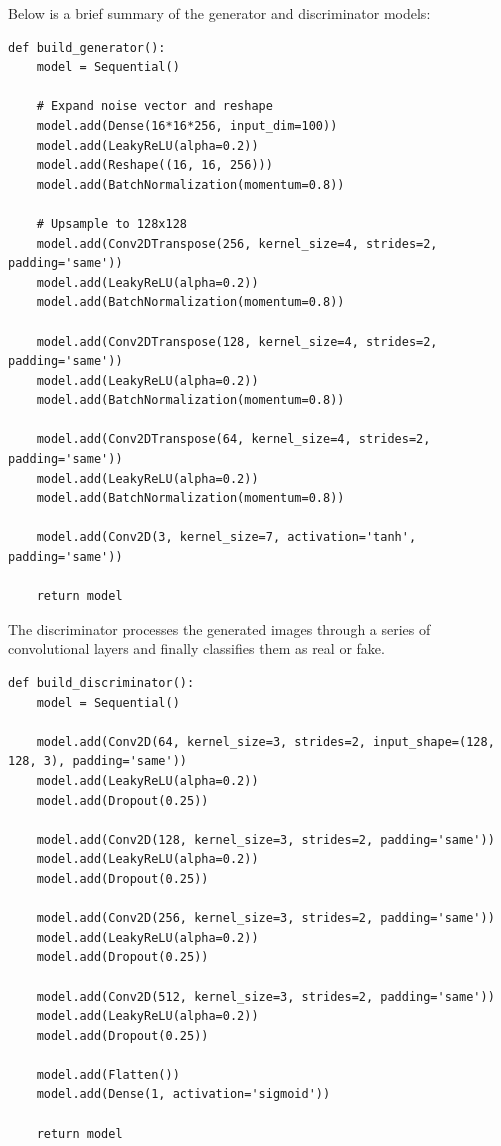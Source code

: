 Below is a brief summary of the generator and discriminator models:

\begin{verbatim}
def build_generator():
    model = Sequential()

    # Expand noise vector and reshape
    model.add(Dense(16*16*256, input_dim=100))
    model.add(LeakyReLU(alpha=0.2))
    model.add(Reshape((16, 16, 256)))
    model.add(BatchNormalization(momentum=0.8))

    # Upsample to 128x128
    model.add(Conv2DTranspose(256, kernel_size=4, strides=2, padding='same'))
    model.add(LeakyReLU(alpha=0.2))
    model.add(BatchNormalization(momentum=0.8))

    model.add(Conv2DTranspose(128, kernel_size=4, strides=2, padding='same'))
    model.add(LeakyReLU(alpha=0.2))
    model.add(BatchNormalization(momentum=0.8))

    model.add(Conv2DTranspose(64, kernel_size=4, strides=2, padding='same'))
    model.add(LeakyReLU(alpha=0.2))
    model.add(BatchNormalization(momentum=0.8))

    model.add(Conv2D(3, kernel_size=7, activation='tanh', padding='same'))

    return model
\end{verbatim}

The discriminator processes the generated images through a series of convolutional layers and finally classifies them as real or fake.

\begin{verbatim}
def build_discriminator():
    model = Sequential()

    model.add(Conv2D(64, kernel_size=3, strides=2, input_shape=(128, 128, 3), padding='same'))
    model.add(LeakyReLU(alpha=0.2))
    model.add(Dropout(0.25))

    model.add(Conv2D(128, kernel_size=3, strides=2, padding='same'))
    model.add(LeakyReLU(alpha=0.2))
    model.add(Dropout(0.25))

    model.add(Conv2D(256, kernel_size=3, strides=2, padding='same'))
    model.add(LeakyReLU(alpha=0.2))
    model.add(Dropout(0.25))

    model.add(Conv2D(512, kernel_size=3, strides=2, padding='same'))
    model.add(LeakyReLU(alpha=0.2))
    model.add(Dropout(0.25))

    model.add(Flatten())
    model.add(Dense(1, activation='sigmoid'))

    return model
\end{verbatim}

